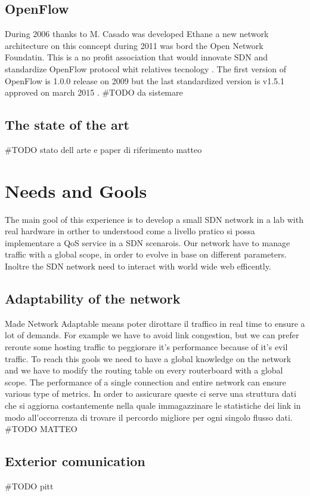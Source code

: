 \documentclass[conference,10pt]{IEEEtran}
\begin{document}
  \subsection{OpenFlow}
  During 2006 thanks to M. Casado was developed Ethane a new network architecture on this conncept during 2011 was bord the Open Network Foundatin.
  This is a no profit association that would innovate SDN and standardize OpenFlow protocol whit relatives tecnology \cite{ONF}.
  The first version of OpenFlow is 1.0.0 release on 2009 but the last standardized version is v1.5.1 approved on march 2015 \cite{ONF_report}.
  \#TODO da sistemare
  \subsection{The state of the art}
  \#TODO stato dell arte e paper di riferimento  matteo

\section{Needs and Gools}\label{sec:obb} %
The main gool of this experience is to develop a small SDN network in a lab with real hardware
in orther to understood come a livello pratico si possa implementare  a QoS service in a SDN scenarois.
Our network have to manage traffic with a global scope, in order to evolve in base on different parameters.
Inoltre the SDN network need to interact with world wide web efficently.
  \subsection{Adaptability of the network}
  Made Network Adaptable means poter dirottare il traffico in real time to ensure a lot of demands. For example we have to avoid link congestion, 
  but we can prefer reroute some hosting traffic to peggiorare it's performance because of it's evil traffic.
  To reach this gools we need to have a global knowledge on the network and we have to modify the routing table on every routerboard with a 
  global scope.
  The performance of a single connection and entire network can ensure various type of metrics.
  In order to assicurare queste ci serve una struttura dati che si aggiorna costantemente nella quale immagazzinare le statistiche dei link 
  in modo all'occorrenza di trovare il percordo migliore per ogni singolo flusso dati.
  \#TODO MATTEO
  \subsection{Exterior comunication}
  \#TODO pitt
  
\end{document}
